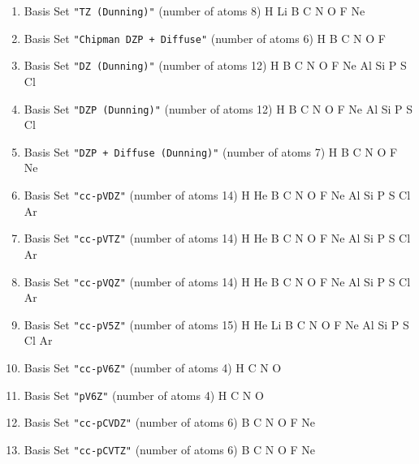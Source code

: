 \begin{enumerate}
\item Basis Set \verb#"TZ (Dunning)"# (number of atoms 8)  \newline 
  H Li B C N O F Ne


\item Basis Set \verb#"Chipman DZP + Diffuse"# (number of atoms 6)  \newline 
  H B C N O F


\item Basis Set \verb#"DZ (Dunning)"# (number of atoms 12)  \newline 
  H B C N O F Ne Al Si P S Cl


\item Basis Set \verb#"DZP (Dunning)"# (number of atoms 12)  \newline 
  H B C N O F Ne Al Si P S Cl


\item Basis Set \verb#"DZP + Diffuse (Dunning)"# (number of atoms 7)  \newline 
  H B C N O F Ne


\item Basis Set \verb#"cc-pVDZ"# (number of atoms 14)  \newline 
  H He B C N O F Ne Al Si P S Cl Ar


\item Basis Set \verb#"cc-pVTZ"# (number of atoms 14)  \newline 
  H He B C N O F Ne Al Si P S Cl Ar


\item Basis Set \verb#"cc-pVQZ"# (number of atoms 14)  \newline 
  H He B C N O F Ne Al Si P S Cl Ar


\item Basis Set \verb#"cc-pV5Z"# (number of atoms 15)  \newline 
  H He Li B C N O F Ne Al Si P S Cl Ar


\item Basis Set \verb#"cc-pV6Z"# (number of atoms 4)  \newline 
  H C N O


\item Basis Set \verb#"pV6Z"# (number of atoms 4)  \newline 
  H C N O


\item Basis Set \verb#"cc-pCVDZ"# (number of atoms 6)  \newline 
  B C N O F Ne


\item Basis Set \verb#"cc-pCVTZ"# (number of atoms 6)  \newline 
  B C N O F Ne



\end{enumerate}
